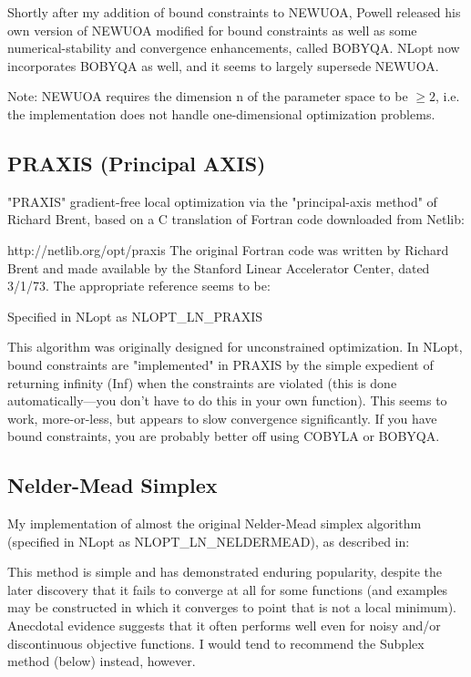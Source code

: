 Shortly after my addition of bound constraints to NEWUOA, Powell released his own version of NEWUOA modified for bound constraints as well as some numerical-stability and convergence enhancements, called BOBYQA. NLopt now incorporates BOBYQA as well, and it seems to largely supersede NEWUOA. 

Note: NEWUOA requires the dimension n of the parameter space to be $\geq 2$, i.e. the implementation does not handle one-dimensional optimization problems. 



\subsection{PRAXIS (Principal AXIS)}
"PRAXIS" gradient-free local optimization via the "principal-axis method" of Richard Brent, based on a C translation of Fortran code downloaded from Netlib: 

http://netlib.org/opt/praxis 
The original Fortran code was written by Richard Brent and made available by the Stanford Linear Accelerator Center, dated 3/1/73. The appropriate reference seems to be: \cite{Brent_1972}


Specified in NLopt as NLOPT\_LN\_PRAXIS 

This algorithm was originally designed for unconstrained optimization. In NLopt, bound constraints are "implemented" in PRAXIS by the simple expedient of returning infinity (Inf) when the constraints are violated (this is done automatically—you don't have to do this in your own function). This seems to work, more-or-less, but appears to slow convergence significantly. If you have bound constraints, you are probably better off using COBYLA or BOBYQA. 





\subsection{Nelder-Mead Simplex}
My implementation of almost the original Nelder-Mead simplex algorithm (specified in NLopt as NLOPT\_LN\_NELDERMEAD), as described in: \cite{Nelder_1965}


This method is simple and has demonstrated enduring popularity, despite the later discovery that it fails to converge at all for some functions (and examples may be constructed in which it converges to point that is not a local minimum). Anecdotal evidence suggests that it often performs well even for noisy and/or discontinuous objective functions. I would tend to recommend the Subplex method (below) instead, however. 

